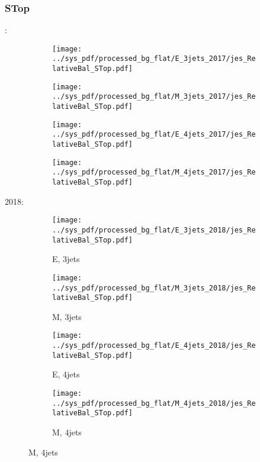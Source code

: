 \documentclass{beamer}
\begin{document}
\begin{frame}
\frametitle{STop}
\fontsize{5}{1}:
\begin{figure}
\centering
\begin{subfigure}[b]{0.24\textwidth}
\texttt{[image: ../sys\_pdf/processed\_bg\_flat/E\_3jets\_2017/jes\_RelativeBal\_STop.pdf]}
\end{subfigure}
\begin{subfigure}[b]{0.24\textwidth}
\texttt{[image: ../sys\_pdf/processed\_bg\_flat/M\_3jets\_2017/jes\_RelativeBal\_STop.pdf]}
\end{subfigure}
\begin{subfigure}[b]{0.24\textwidth}
\texttt{[image: ../sys\_pdf/processed\_bg\_flat/E\_4jets\_2017/jes\_RelativeBal\_STop.pdf]}
\end{subfigure}
\begin{subfigure}[b]{0.24\textwidth}
\texttt{[image: ../sys\_pdf/processed\_bg\_flat/M\_4jets\_2017/jes\_RelativeBal\_STop.pdf]}
\end{subfigure}
\end{figure}
2018:
\begin{figure}
\centering
\begin{subfigure}[b]{0.24\textwidth}
\texttt{[image: ../sys\_pdf/processed\_bg\_flat/E\_3jets\_2018/jes\_RelativeBal\_STop.pdf]}
\captionsetup{font=tiny}
\caption{E, 3jets}
\end{subfigure}
\begin{subfigure}[b]{0.24\textwidth}
\texttt{[image: ../sys\_pdf/processed\_bg\_flat/M\_3jets\_2018/jes\_RelativeBal\_STop.pdf]}
\captionsetup{font=tiny}
\caption{M, 3jets}
\end{subfigure}
\begin{subfigure}[b]{0.24\textwidth}
\texttt{[image: ../sys\_pdf/processed\_bg\_flat/E\_4jets\_2018/jes\_RelativeBal\_STop.pdf]}
\captionsetup{font=tiny}
\caption{E, 4jets}
\end{subfigure}
\begin{subfigure}[b]{0.24\textwidth}
\texttt{[image: ../sys\_pdf/processed\_bg\_flat/M\_4jets\_2018/jes\_RelativeBal\_STop.pdf]}
\captionsetup{font=tiny}
\caption{M, 4jets}
\end{subfigure}
\end{figure}
\end{frame}
\end{document}
